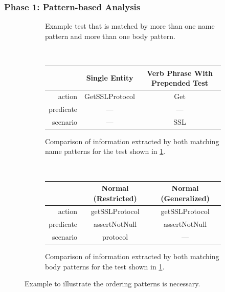\documentclass[proposal.tex]{subfiles}
\begin{document}
\subsubsection{Phase 1: Pattern-based Analysis}
\label{sec:Pattern-based-Analysis}

\begin{figure}[t]
    \centering
    \begin{subfigure}{0.9\textwidth}
        \caption{Example test that is matched by more than one name pattern and more than one body pattern.}
        \label{fig:approach-0}
    \end{subfigure}
    \\[1ex]
        \begin{subfigure}[b]{\columnwidth}
            \centering
            \begin{tabular}{rcc}
            \toprule
                      & Single Entity  & Verb Phrase With Prepended Test \\
            \midrule
            action    & GetSSLProtocol & Get \\
            predicate & ---            & --- \\
            scenario  & ---            & SSL \\
            \bottomrule
            \end{tabular}
            \caption{Comparison of information extracted by both matching name patterns for the test shown in \cref{fig:approach-0}.}
            \label{fig:approach-1}
        \end{subfigure}
    \\[1ex]
    \begin{subfigure}[b]{\columnwidth}
        \centering
        \begin{tabular}{rcc}
        \toprule
                  & Normal (Restricted) & Normal (Generalized) \\
        \midrule
        action    & getSSLProtocol    & getSSLProtocol \\
        predicate & assertNotNull     & assertNotNull \\
        scenario  & protocol          & --- \\
        \bottomrule
        \end{tabular}
        \caption{Comparison of information extracted by both matching body patterns for the test shown in \cref{fig:approach-0}.}
        \label{fig:approach-2}
    \end{subfigure}    
    \caption{Example to illustrate the ordering patterns is necessary.}
    \label{fig:approach-example}
\end{figure}
\end{document}
